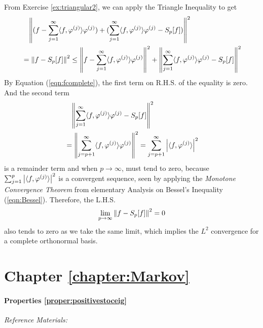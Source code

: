 From Exercise \ref{ex:triangular2}, we can apply the Triangle Inequality to get
\begin{align}
&\quad \norm{(f - \sum_{j=1}^{\infty} \langle f, \varphi^{(j)} \rangle \varphi^{(j)}) + (\sum_{j=1}^{\infty} \langle f, \varphi^{(j)} \rangle \varphi^{(j)} - S_p[f])}^2 \nonumber \\
&= \norm{f - S_p[f]}^2 \leq \norm{f - \sum_{j=1}^{\infty} \langle f, \varphi^{(j)} \rangle \varphi^{(j)}}^2 + \norm{\sum_{j=1}^{\infty} \langle f, \varphi^{(j)} \rangle \varphi^{(j)} - S_p[f]}^2
\end{align}
By Equation (\ref{eqn:fcomplete}), the first term on R.H.S. of the equality is zero. And the second term
\begin{align}
&\quad \norm{\sum_{j=1}^{\infty} \langle f, \varphi^{(j)} \rangle \varphi^{(j)} - S_p[f]}^2 \nonumber \\
&= \norm{\sum_{j=p+1}^{\infty} \langle f, \varphi^{(j)} \rangle \varphi^{(j)}}^2 = \sum_{j=p+1}^{\infty} \abs{\langle f, \varphi^{(j)} \rangle}^2
\end{align}
is a remainder term and when $p \to \infty$, must tend to zero, because $\sum_{j=1}^{p} \abs{\langle f, \varphi^{(j)} \rangle}^2$ is a convergent sequence, seen by applying the \textit{Monotone Convergence Theorem} from elementary Analysis on Bessel's Inequality (\ref{eqn:Bessel}). Therefore, the L.H.S.
\begin{align}
\lim_{p \to \infty}\norm{f - S_p[f]}^2 = 0
\end{align}
also tends to zero as we take the same limit, which implies the $L^2$ convergence for a complete orthonormal basis.

\section{Chapter \ref*{chapter:Markov}}
\label{section:Markovappend}

\paragraph{Properties \ref*{proper:positivestoceig}}

\textit{Reference Materials: \cite{markov}}

